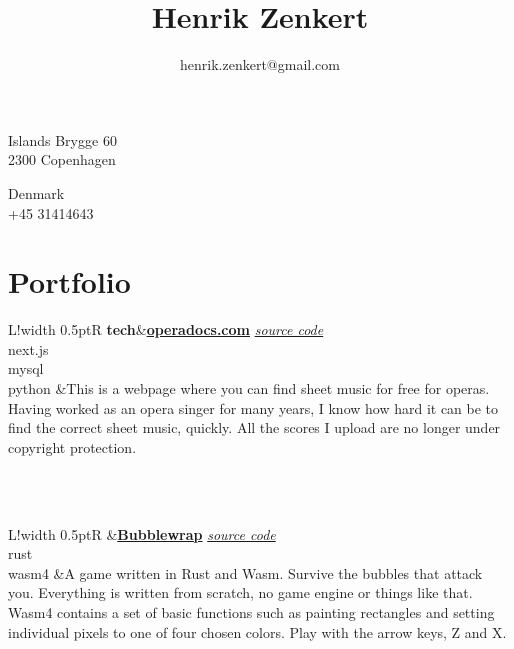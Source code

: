\documentclass{article}
\title{\bfseries\Huge Henrik Zenkert}
\author{henrik.zenkert@gmail.com}
\date{}
\newcommand\VRule{\color{lightgray}\vrule width 0.5pt}
\begin{document}
\renewcommand{\arraystretch}{1}
\maketitle
\vspace{1em}
\begin{minipage}[ht]{0.48\textwidth}
Islands Brygge 60\\
2300 Copenhagen\\
\end{minipage}
\begin{minipage}[ht]{0.48\textwidth}
Denmark\\
+45 31414643\\
\end{minipage}
\vspace{10pt}

\section*{Portfolio}
\begin{tabular}{L!{\VRule}R}
{\bf tech}&{\bf \href{https://operadocs.com/}{operadocs.com}}\hspace*{\fill} \textit{\href{https://github.com/YesSeri/opera-docs}{source code}}\\
  next.js\\
  mysql\\
  python
&This is a webpage where you can find sheet music for free for operas. Having worked as an opera singer for many years, I know how hard it can be to find the correct sheet music, quickly. All the scores I upload are no longer under copyright protection.
\end{tabular}
\\
\vspace{5pt}
\\
\begin{tabular}{L!{\VRule}R}
&{\bf \href{https://yesseri.github.io/bubblewrap.html}{Bubblewrap}}\hspace*{\fill} \textit{\href{https://github.com/YesSeri/opera-docs}{source code}}\\
  rust\\
  wasm4
&A game written in Rust and Wasm. Survive the bubbles that attack you. Everything is written from scratch, no game engine or things like that. Wasm4 contains a set of basic functions such as painting rectangles and setting individual pixels to one of four chosen colors. Play with the arrow keys, Z and X.
\end{tabular}
\\
\end{document}
